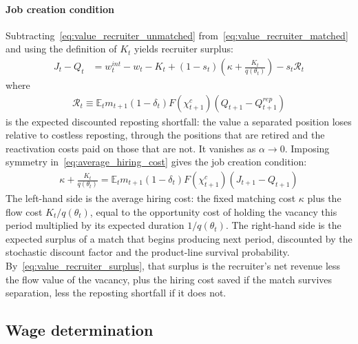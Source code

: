 \documentclass[authoryear, review, 12pt]{elsarticle}
\begin{document}
	\paragraph{Job creation condition}
	Subtracting~\eqref{eq:value_recruiter_unmatched}
	from~\eqref{eq:value_recruiter_matched} and using the definition 
	of $K_t$ yields recruiter surplus:
	\begin{align}\label{eq:value_recruiter_surplus}
		J_t - Q_t &= w_t^{int}-w_t - K_t
		+ (1-s_t)\left(\kappa+\frac{K_t}{q(\theta_t)}\right)-s_t\mathcal{R}_t
	\end{align}
	where
	\begin{align}\label{eq:repost_shortfall}
		\mathcal{R}_t\equiv\mathbb{E}_tm_{t+1}(1-\delta_t)F(\chi_{t+1}^c)\left(Q_{t+1}-Q_{t+1}^{rep}\right)
	\end{align}
	is the expected discounted reposting shortfall: the value a separated position loses
	relative to costless reposting, through the positions that are retired and the
	reactivation costs paid on those that are not. It vanishes as
	$\alpha\to0$. Imposing symmetry
	in~\eqref{eq:average_hiring_cost} gives the job creation
	condition:
\begin{align}\label{eq:jcc}
	\kappa+\frac{K_t}{q(\theta_t)} = 
	\mathbb{E}_t m_{t+1}(1-\delta_t)F(\chi_{t+1}^c)
	\left(J_{t+1}-Q_{t+1}\right)
\end{align}
	The left-hand side is the average hiring cost: the fixed 
	matching cost $\kappa$ plus the flow cost $K_t/q(\theta_t)$, 
	equal to the opportunity cost of holding the vacancy this 
	period multiplied by its expected duration $1/q(\theta_t)$. 
	The right-hand side is the expected surplus of a match that
	begins producing next period, discounted by the stochastic
	discount factor and the product-line survival probability.
	By~\eqref{eq:value_recruiter_surplus}, that surplus is the
	recruiter's net revenue less the flow value of the vacancy,
	plus the hiring cost saved if the match survives separation,
	less the reposting shortfall if it does not.
	
	\subsection{Wage determination}
	
\end{document}
